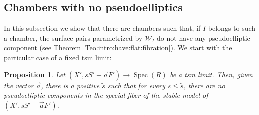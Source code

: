 \documentclass[11pt]{amsart}
\newcommand{\cE}{\mathcal{W}}
\newcommand{\spec}{\operatorname{Spec}}
\newtheorem{Prop}[theorem]{Proposition}
\theoremstyle{definition}
\begin{document}
\subsection{Chambers with no pseudoelliptics} 
In this subsection we show that there are chambers such that, if $I$ belongs to such a chamber, the surface pairs parametrized by $\cE_I$ do not have any pseudoelliptic component (see Theorem \ref{Teo:intro:have:flat:fibration}). We start with the particular
case of a fixed tsm limit:
\begin{Prop}\label{Prop:no:psdo:fixed:tsm:limit}
 Let $(X',sS'+\vec{a}F') \to \spec(R)$ be a tsm limit. Then, given the vector $\vec{a}$, there is a positive $\widetilde{s}$ such that for every $s \le \widetilde{s}$,
 there are no pseudoelliptic components in the special fiber of the stable model of $(X',sS'+\vec{a}F')$.
\end{Prop}
\end{document}
